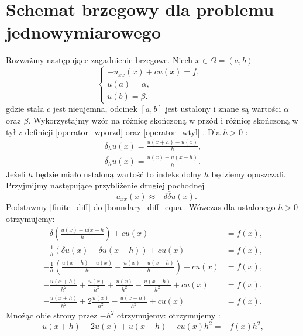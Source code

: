 \documentclass[12pt,a4paper]{report}
\begin{document}
\section{Schemat brzegowy dla problemu jednowymiarowego}
Rozważmy następujące zagadnienie brzegowe. Niech $ x \in \Omega = (a,b) $
\begin{equation} \label{boundary_diff_equa}
\left\{ \begin{array}{ll}
-u_{xx}(x) + cu(x) =f, & \\
u(a) = \alpha, & \\
u(b) = \beta. & 
\end{array} \right.
\end{equation}
gdzie stała $c$ jest nieujemna, odcinek $ [a,b]$ jest ustalony i znane są wartości $\alpha$ oraz $\beta$. Wykorzystajmy wzór na różnicę skończoną w przód i różnicę skończoną w tył z definicji \ref{operator_wporzd} oraz \ref{operator_wtyl} . Dla $h>0$ :
\begin{equation} \label{finite_diff}
\begin{array}{c}
\delta_h u(x) = \frac{u(x+h) - u(x)}{h},   \\
\overline{\delta_h} u(x) = \frac{u(x)-u(x-h)}{h} . 
\end{array}
\end{equation}
Jeżeli $h$ będzie miało ustaloną wartość to indeks dolny $h$ będziemy opuszczali. Przyjmijmy następujące przybliżenie drugiej pochodnej
$$
-u_{xx}(x) \approx -\delta \overline{\delta} u(x).
$$
Podstawmy \eqref{finite_diff} do \eqref{boundary_diff_equa}. Wówczas dla ustalonego $h>0$ otrzymujemy: 
\begin{equation}
\begin{array}{rl}
-\delta (\frac{u(x)-u(x-h}{h}) + cu(x) &= f(x),  \\
- \frac{1}{h} (\delta u(x) - \delta u(x-h) ) + cu(x) &= f(x), \\
-\frac{1}{h} (\frac{u(x+h)-u(x)}{h} - \frac{u(x)-u(x-h)}{h}) + cu(x) &= f(x), \\
-\frac{u(x+h)}{h^2} + \frac{u(x)}{h^2} + \frac{u(x)}{h^2} - \frac{u(x-h)}{h^2} +cu(x)& = f(x), \\
-\frac{u(x+h)}{h^2} + 2\frac{u(x)}{h^2} - \frac{u(x-h)}{h^2} +cu(x) &= f(x) .
\end{array}
\end{equation}
Mnożąc obie strony przez $-h^2$ otrzymujemy:  otrzymujemy :
\begin{equation}
u(x+h) - 2u(x) + u(x-h) - cu(x)h^2 = -f(x)h^2,
\end{equation}
\end{document}
